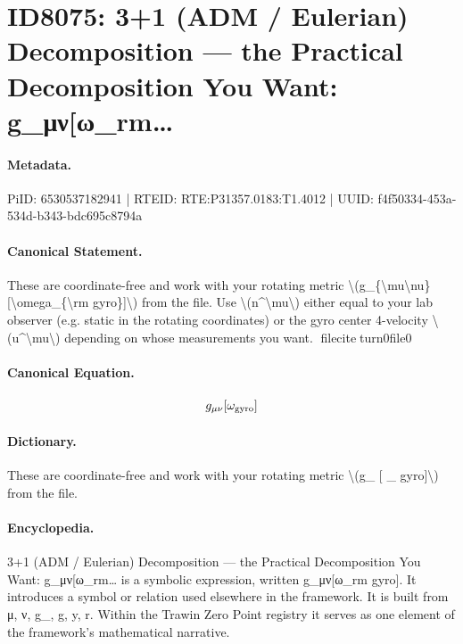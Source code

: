 \section*{ID8075: 3+1 (ADM / Eulerian) Decomposition — the Practical Decomposition You Want: g\_μν[ω\_rm…}
\paragraph{Metadata.}
PiID: 6530537182941 | RTEID: RTE:P31357.0183:T1.4012 | UUID: f4f50334-453a-534d-b343-bdc695c8794a

\paragraph{Canonical Statement.}
These are coordinate-free and work with your rotating metric \textbackslash{}(g\_\{\textbackslash{}mu\textbackslash{}nu\}[\textbackslash{}omega\_\{\textbackslash{}rm gyro\}]\textbackslash{}) from the file. Use \textbackslash{}(n\textasciicircum{}\textbackslash{}mu\textbackslash{}) either equal to your lab observer (e.g. static in the rotating coordinates) or the gyro center 4-velocity \textbackslash{}(u\textasciicircum{}\textbackslash{}mu\textbackslash{}) depending on whose measurements you want. fileciteturn0file0

\paragraph{Canonical Equation.}
\[
g_{\mu\nu}[\omega_{\rm gyro}]
\]

\paragraph{Dictionary.}
These are coordinate-free and work with your rotating metric \textbackslash{}(g\_ [ \_ gyro]\textbackslash{}) from the file.

\paragraph{Encyclopedia.}
3+1 (ADM / Eulerian) Decomposition — the Practical Decomposition You Want: g\_μν[ω\_rm… is a symbolic expression, written g\_μν[ω\_rm gyro]. It introduces a symbol or relation used elsewhere in the framework. It is built from μ, ν, g\_, g, y, r. Within the Trawin Zero Point registry it serves as one element of the framework's mathematical narrative.
